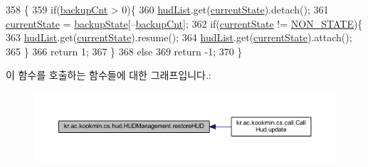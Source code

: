 \begin{DoxyCode}
358                                 \{
359     \textcolor{keywordflow}{if}(\hyperlink{classkr_1_1ac_1_1kookmin_1_1cs_1_1hud_1_1_h_u_d_management_a4d8dcd83fa46fb810848d39518bd2a89}{backupCnt} > 0)\{
360       \hyperlink{classkr_1_1ac_1_1kookmin_1_1cs_1_1hud_1_1_h_u_d_management_a9eec206ae0d3464de9e92243ae0aba24}{hudList}.get(\hyperlink{classkr_1_1ac_1_1kookmin_1_1cs_1_1hud_1_1_h_u_d_management_a6e135a288ebdc4381eb971ab03d0bd6e}{currentState}).detach();
361       \hyperlink{classkr_1_1ac_1_1kookmin_1_1cs_1_1hud_1_1_h_u_d_management_a6e135a288ebdc4381eb971ab03d0bd6e}{currentState} = \hyperlink{classkr_1_1ac_1_1kookmin_1_1cs_1_1hud_1_1_h_u_d_management_a2e980ba0f951c11c7b41190197f138fb}{backupState}[--\hyperlink{classkr_1_1ac_1_1kookmin_1_1cs_1_1hud_1_1_h_u_d_management_a4d8dcd83fa46fb810848d39518bd2a89}{backupCnt}];
362       \textcolor{keywordflow}{if}(\hyperlink{classkr_1_1ac_1_1kookmin_1_1cs_1_1hud_1_1_h_u_d_management_a6e135a288ebdc4381eb971ab03d0bd6e}{currentState} != \hyperlink{classkr_1_1ac_1_1kookmin_1_1cs_1_1hud_1_1_h_u_d_management_aed0bc1b7b1fd78bb588e2321b44cb254}{NON\_STATE})\{
363         \hyperlink{classkr_1_1ac_1_1kookmin_1_1cs_1_1hud_1_1_h_u_d_management_a9eec206ae0d3464de9e92243ae0aba24}{hudList}.get(\hyperlink{classkr_1_1ac_1_1kookmin_1_1cs_1_1hud_1_1_h_u_d_management_a6e135a288ebdc4381eb971ab03d0bd6e}{currentState}).resume();
364         \hyperlink{classkr_1_1ac_1_1kookmin_1_1cs_1_1hud_1_1_h_u_d_management_a9eec206ae0d3464de9e92243ae0aba24}{hudList}.get(\hyperlink{classkr_1_1ac_1_1kookmin_1_1cs_1_1hud_1_1_h_u_d_management_a6e135a288ebdc4381eb971ab03d0bd6e}{currentState}).attach();
365       \}
366       \textcolor{keywordflow}{return} 1;
367     \}
368     \textcolor{keywordflow}{else}
369       \textcolor{keywordflow}{return} -1;
370   \}
\end{DoxyCode}


이 함수를 호출하는 함수들에 대한 그래프입니다.\+:\nopagebreak
\begin{figure}[H]
\begin{center}
\leavevmode
\includegraphics[width=350pt]{classkr_1_1ac_1_1kookmin_1_1cs_1_1hud_1_1_h_u_d_management_a946946e34bd696cf5d51c9d7bd2da38e_icgraph}
\end{center}
\end{figure}


